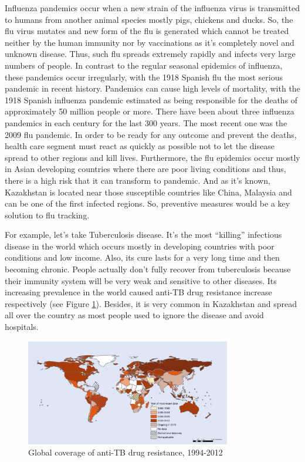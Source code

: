 Influenza pandemics occur when a new strain of the influenza virus is transmitted to humans from another animal species mostly pigs, chickens and ducks. So, the flu virus mutates and new form of the flu is generated which cannot be treated neither by the human immunity nor by vaccinations as it’s completely novel and unknown disease. Thus, such flu spreads extremely rapidly and infects very large numbers of people. In contrast to the regular seasonal epidemics of influenza, these pandemics occur irregularly, with the 1918 Spanish flu the most serious pandemic in recent history. Pandemics can cause high levels of mortality, with the 1918 Spanish influenza pandemic estimated as being responsible for the deaths of approximately 50 million people or more. There have been about three influenza pandemics in each century for the last 300 years. The most recent one was the 2009 flu pandemic. In order to be ready for any outcome and prevent the deaths, health care segment must react as quickly as possible not to let the disease spread to other regions and kill lives. Furthermore, the flu epidemics occur mostly in Asian developing countries where there are poor living conditions and thus, there is a high risk that it can transform to pandemic. And as it’s known, Kazakhstan is located near those susceptible countries like China, Malaysia and can be one of the first infected regions. So, preventive measures would be a key solution to flu tracking.

For example, let’s take Tuberculosis disease. It’s the most “killing” infectious disease in the world which occurs mostly in developing countries with poor conditions and low income. Also, its cure lasts for a very long time and then becoming chronic. People actually don’t fully recover from tuberculosis because their immunity system will be very weak and sensitive to other diseases. Its increasing prevalence in the world caused anti-TB drug resistance increase respectively (see Figure \ref{fig6}). Besides, it is very common in Kazakhstan and spread all over the country as most people used to ignore the disease and avoid hospitals.

\begin{figure}[H]
  \centering
  \includegraphics[width=0.8\textwidth]{img/Fig6}
  \caption{Global coverage of anti-TB drug resistance, 1994-2012}
  \label{fig6}
\end{figure}

